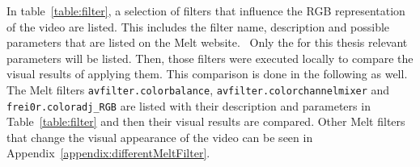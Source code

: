 \documentclass[../MasterThesis.tex]{subfiles}
\begin{document}
In table~\ref{table:filter}, a selection of filters that influence the RGB representation of the video are listed. This includes the filter name, description and possible parameters that are listed on the Melt website.~\cite{melt_filters} Only the for this thesis relevant parameters will be listed.
Then, those filters were executed locally to compare the visual results of applying them. This comparison is done in the following as well.
The Melt filters \texttt{avfilter.colorbalance}, \texttt{avfilter\-.colorchannelmixer} and \texttt{frei0r\-.coloradj\_RGB} are listed with their description and parameters in Table~\ref{table:filter} and then their visual results are compared. Other Melt filters that change the visual appearance of the video can be seen in Appendix~\ref{appendix:differentMeltFilter}.
\end{document}
